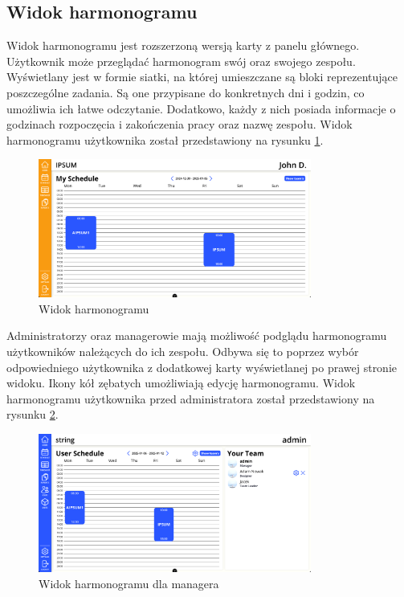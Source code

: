 \subsection{Widok harmonogramu}

Widok harmonogramu jest rozszerzoną wersją karty z panelu głównego. Użytkownik może przeglądać harmonogram swój oraz swojego zespołu. Wyświetlany jest w formie siatki, na której umieszczane są bloki reprezentujące poszczególne zadania. Są one przypisane do konkretnych dni i godzin, co umożliwia ich łatwe odczytanie. Dodatkowo, każdy z nich posiada informacje o godzinach rozpoczęcia i zakończenia pracy oraz nazwę zespołu. Widok harmonogramu użytkownika został przedstawiony na rysunku \ref{fig:scheduleView}.

\begin{figure}[H]
    \centering
    \includegraphics[width=0.8\textwidth, frame]{graf/front/schedule.png}
    \caption{Widok harmonogramu}
    \label{fig:scheduleView}
\end{figure}

Administratorzy oraz managerowie mają możliwość podglądu harmonogramu użytkowników należących do ich zespołu. Odbywa się to poprzez wybór odpowiedniego użytkownika z dodatkowej karty wyświetlanej po prawej stronie widoku. Ikony kół zębatych umożliwiają edycję harmonogramu. Widok harmonogramu użytkownika przed administratora został przedstawiony na rysunku \ref{fig:scheduleManagerView}.

\begin{figure}[H]
    \centering
    \includegraphics[width=0.8\textwidth, frame]{graf/front/userSchedule.png}
    \caption{Widok harmonogramu dla managera}
    \label{fig:scheduleManagerView}
\end{figure}

